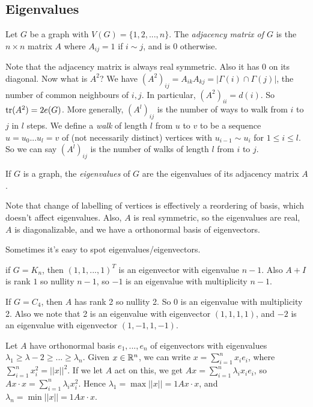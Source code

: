\documentclass[a4paper]{article}
\begin{document}
\subsection{Eigenvalues}
\begin{defi}
Let $G$ be a graph with $V(G) = \{1,2,...,n\}$. The \emph{adjacency matrix of $G$} is the $n \times n$ matrix $A$ where $A_{ij}=1$ if $i \sim j$, and is $0$ otherwise.
\end{defi}

Note that the adjacency matrix is always real symmetric. Also it has 0 on its diagonal. Now what is $A^2$? We have $(A^2)_{ij} = A_{ik}A_{kj} = |\Gamma(i) \cap \Gamma(j)|$, the number of common neighbours of $i,j$. In particular, $(A^2)_{ii} = d(i)$. So $\operatorname{tr}(A^2) = 2e(G)$. More generally, $(A^l)_{ij}$ is the number of ways to walk from $i$ to $j$ in $l$ steps. We define a \emph{walk} of length $l$ from $u$ to $v$ to be a sequence $u=u_0...u_l = v$ of (not necessarily distinct) vertices with $u_{i-1} \sim u_i$ for $1 \leq i \leq l$. So we can say $(A^l)_{ij}$ is the number of walks of length $l$ from $i$ to $j$.

If $G$ is a graph, the \emph{eigenvalues} of $G$ are the eigenvalues of its adjacency matrix $A$.

Note that change of labelling of vertices is effectively a reordering of basis, which doesn't affect eigenvalues. Also, $A$ is real symmetric, so the eigenvalues are real, $A$ is diagonalizable, and we have a orthonormal basis of eigenvectors.

Sometimes it's easy to spot eigenvalues/eigenvectors.

\begin{eg}
if $G=K_n$, then $(1,1,...,1)^T$ is an eigenvector with eigenvalue $n-1$. Also $A+I$ is rank $1$ so nullity $n-1$, so $-1$ is an eigenvalue with multiplicity $n-1$.
\end{eg}

\begin{eg}
If $G=C_4$, then $A$ has rank 2 so nullity 2. So $0$ is an eigenvalue with multiplicity 2. Also we note that 2 is an eigenvalue with eigenvector $(1,1,1,1)$, and $-2$ is an eigenvalue with eigenvector $(1,-1,1,-1)$.
\end{eg}

Let $A$ have orthonormal basis $e_1,...,e_n$ of eigenvectors with eigenvalues $\lambda_1 \geq \lambda-2 \geq ... \geq \lambda_n$. Given $x \in \mathbb{R}^n$, we can write $x = \sum_{i=1}^n x_i e_i$, where $\sum_{i=1}^n x_i^2 = ||x||^2$. If we let $A$ act on this, we get $Ax = \sum_{i=1}^n \lambda_i x_i e_i$, so $Ax \cdot x = \sum_{i=1}^n \lambda_i x_i^2$. Hence $\lambda_1 = \max{||x||=1} Ax \cdot x$, and $\lambda_n = \min{||x||=1} Ax \cdot x$.
\end{document}
